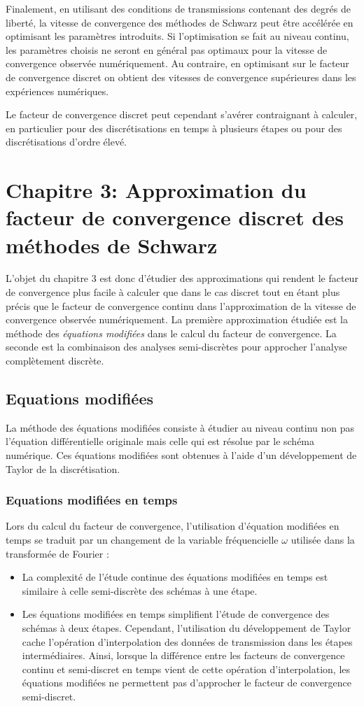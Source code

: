 Finalement, en utilisant des conditions de transmissions
contenant des degrés de liberté, la vitesse de convergence
des méthodes de Schwarz peut être accélérée en optimisant les
paramètres introduits.
Si l'optimisation se fait au niveau continu, les paramètres
choisis ne seront en général pas optimaux pour la vitesse de
convergence observée numériquement. Au contraire, en optimisant
sur le facteur de convergence discret on obtient des vitesses de
convergence supérieures dans les expériences numériques.
\par
Le facteur de convergence discret peut cependant s'avérer
contraignant à calculer, en particulier pour des discrétisations
en temps à plusieurs étapes ou pour des discrétisations d'ordre
élevé.
\section*{Chapitre 3: Approximation du facteur de convergence discret des méthodes de Schwarz}
 L'objet du chapitre 3 est donc d'étudier des approximations
qui rendent le facteur de convergence plus facile à calculer
que dans le cas discret tout en étant plus précis que le facteur
de convergence continu dans l'approximation de la vitesse
de convergence observée numériquement.
La première approximation étudiée est la méthode des
\textit{équations modifiées} dans le calcul du facteur de convergence.
La seconde est la combinaison des analyses semi-discrètes
pour approcher l'analyse complètement discrète.
\subsection*{Equations modifiées}
La méthode des équations modifiées consiste à étudier au niveau
continu non pas l'équation différentielle originale mais celle
qui est résolue par le schéma numérique. 
Ces équations modifiées sont obtenues à l'aide d'un développement
de Taylor de la discrétisation.
\subsubsection*{Equations modifiées en temps}
Lors du calcul du facteur de convergence, l'utilisation d'équation
modifiées en temps se traduit par un changement de la variable
fréquencielle $\omega$ utilisée dans la transformée de Fourier :
\begin{itemize}
	\item
La complexité de l'étude continue des équations modifiées en temps
est similaire à celle semi-discrète des schémas à une étape.
	\item
Les équations modifiées en temps simplifient l'étude de convergence
des schémas à deux étapes. Cependant, l'utilisation du développement
de Taylor cache l'opération d'interpolation des données de
transmission dans les étapes intermédiaires. Ainsi, lorsque la
différence entre les facteurs de convergence continu
et semi-discret en temps vient de cette opération d'interpolation,
les équations modifiées ne permettent pas d'approcher le facteur
de convergence semi-discret.
\end{itemize}
